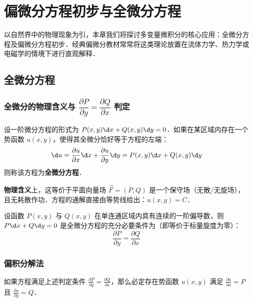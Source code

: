 \documentclass[12pt, a4paper, oneside, UTF8]{ctexbook}
\begin{document}
% 
\else
\fi
\chapter{偏微分方程初步与全微分方程}

以自然界中的物理现象为引，本章我们将探讨多变量微积分的核心应用：全微分方程及偏微分方程初步．经典偏微分教材常常将这类理论放置在流体力学、热力学或电磁学的情境下进行直观解释．

\section{全微分方程}
\subsection{全微分的物理含义与 $\dfrac{\partial P}{\partial y}=\dfrac{\partial Q}{\partial x}$ 判定}

\begin{definition}[全微分方程及其含义]
    设一阶微分方程的形式为 $P(x,y)\d x + Q(x,y)\d y = 0$．如果在某区域内存在一个势函数 $u(x,y)$，使得其全微分恰好等于方程的左端：
    \[ \d u = \frac{\partial u}{\partial x}\d x + \frac{\partial u}{\partial y}\d y = P(x,y)\d x + Q(x,y)\d y \]
    则称该方程为\textbf{全微分方程}．
    
    \textbf{物理含义}上，这等价于平面向量场 $\vec{F} = (P, Q)$ 是一个保守场（无散/无旋场），且无耗散作功．方程的通解直接由等势线给出：$u(x,y) = C$．
\end{definition}

\begin{theorem}
    设函数 $P(x,y)$ 与 $Q(x,y)$ 在单连通区域内具有连续的一阶偏导数，则 $P\d x + Q\d y = 0$ 是全微分方程的充分必要条件为（即等价于标量旋度为零）：
    \[ \frac{\partial P}{\partial y} = \frac{\partial Q}{\partial x} \]
\end{theorem}

\subsection{偏积分解法}
如果方程满足上述判定条件 $\frac{\partial P}{\partial y} = \frac{\partial Q}{\partial x}$，那么必定存在势函数 $u(x,y)$ 满足 $\frac{\partial u}{\partial x} = P$ 且 $\frac{\partial u}{\partial y} = Q$．
\end{document}
